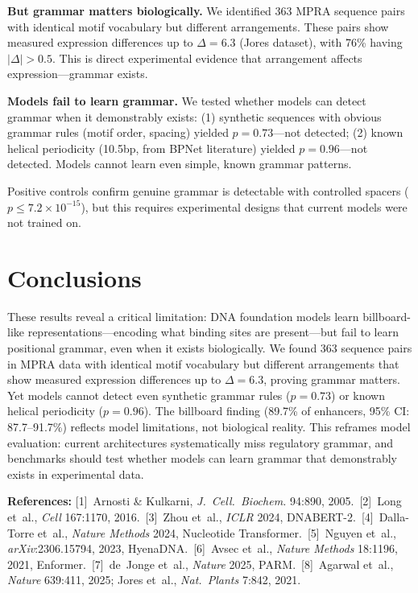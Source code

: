 \documentclass[10pt]{article}
\begin{document}
\textbf{But grammar matters biologically.} We identified 363 MPRA sequence pairs with identical motif vocabulary but different arrangements.
These pairs show measured expression differences up to $\Delta = 6.3$ (Jores dataset), with 76\% having $|\Delta| > 0.5$.
This is direct experimental evidence that arrangement affects expression---grammar exists.

\textbf{Models fail to learn grammar.} We tested whether models can detect grammar when it demonstrably exists: (1) synthetic sequences with obvious grammar rules (motif order, spacing) yielded $p = 0.73$---not detected; (2) known helical periodicity (10.5bp, from BPNet literature) yielded $p = 0.96$---not detected.
Models cannot learn even simple, known grammar patterns.

Positive controls confirm genuine grammar is detectable with controlled spacers ($p \le 7.2\times10^{-15}$), but this requires experimental designs that current models were not trained on.

\section*{Conclusions}

These results reveal a critical limitation: DNA foundation models learn billboard-like representations---encoding what binding sites are present---but fail to learn positional grammar, even when it exists biologically.
We found 363 sequence pairs in MPRA data with identical motif vocabulary but different arrangements that show measured expression differences up to $\Delta = 6.3$, proving grammar matters.
Yet models cannot detect even synthetic grammar rules ($p = 0.73$) or known helical periodicity ($p = 0.96$).
The billboard finding (89.7\% of enhancers, 95\% CI: 87.7--91.7\%) reflects model limitations, not biological reality.
This reframes model evaluation: current architectures systematically miss regulatory grammar, and benchmarks should test whether models can learn grammar that demonstrably exists in experimental data.

\vspace{4pt}
{\scriptsize
\textbf{References:}
[1]~Arnosti \& Kulkarni, \textit{J.~Cell.~Biochem.} 94:890, 2005.\
[2]~Long et~al., \textit{Cell} 167:1170, 2016.\
[3]~Zhou et~al., \textit{ICLR} 2024, DNABERT-2.\
[4]~Dalla-Torre et~al., \textit{Nature Methods} 2024, Nucleotide Transformer.\
[5]~Nguyen et~al., \textit{arXiv}:2306.15794, 2023, HyenaDNA.\
[6]~Avsec et~al., \textit{Nature Methods} 18:1196, 2021, Enformer.\
[7]~de~Jonge et~al., \textit{Nature} 2025, PARM.\
[8]~Agarwal et~al., \textit{Nature} 639:411, 2025; Jores et~al., \textit{Nat.~Plants} 7:842, 2021.
}
\end{document}
